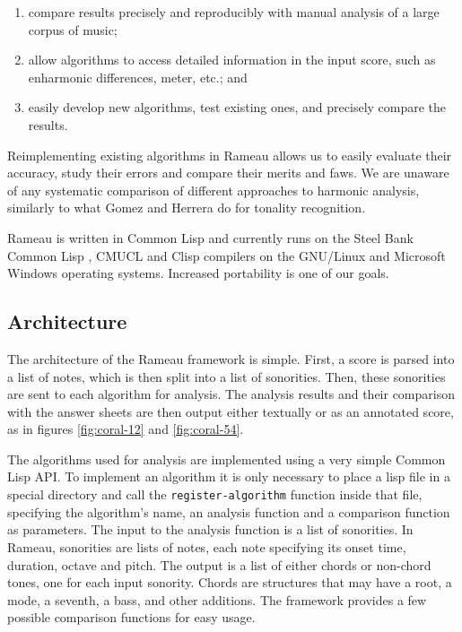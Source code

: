 \documentclass{article}
\begin{document}
\begin{enumerate}
\item compare results precisely and reproducibly with manual analysis
  of a large corpus of music;
\item allow algorithms to access detailed information in the input score,
  such as enharmonic differences, meter, etc.; and
\item easily develop new algorithms, test existing ones, and precisely
  compare the results.
\end{enumerate}

Reimplementing existing algorithms in Rameau allows us to easily
evaluate their accuracy, study their errors and compare their merits
and faws. We are unaware of any systematic comparison of different
approaches to harmonic analysis, similarly to what Gomez and Herrera
\cite{gomez.ea:song} do for tonality recognition.

Rameau is written in Common Lisp and currently runs on the Steel Bank
Common Lisp \cite{team:sbcl}, CMUCL \cite{maclachlan:cmucl} and Clisp
\cite{haible.ea:clisp} compilers on the GNU/Linux and Microsoft
Windows operating systems. Increased portability is one of our goals.

\subsection{Architecture}
\label{sec:architecture-and-api}

The architecture of the Rameau framework is simple. First, a score is
parsed into a list of notes, which is then split into a list of
sonorities. Then, these sonorities are sent to each algorithm for
analysis. The analysis results and their comparison with the answer
sheets are then output either textually or as an annotated score, as
in figures \ref{fig:coral-12} and \ref{fig:coral-54}.

The algorithms used for analysis are implemented using a very simple
Common Lisp API. To implement an algorithm it is only necessary to
place a lisp file in a special directory and call the
\texttt{register-algorithm} function inside that file, specifying the
algorithm's name, an analysis function and a comparison function as
parameters. The input to the analysis function is a list of
sonorities. In Rameau, sonorities are lists of notes, each note
specifying its onset time, duration, octave and pitch. The output is a
list of either chords or non-chord tones, one for each input sonority.
Chords are structures that may have a root, a mode, a seventh, a bass,
and other additions. The framework provides a few possible comparison
functions for easy usage.
\end{document}
